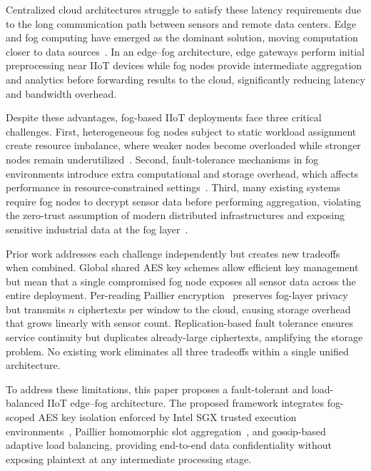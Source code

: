 \documentclass[conference]{IEEEtran}
\begin{document}
    Centralized cloud architectures struggle to satisfy these latency 
    requirements due to the long communication path between sensors and 
    remote data centers. Edge and fog computing have emerged as the 
    dominant solution, moving computation closer to data 
    sources~\cite{jin2024}. In an edge--fog architecture, edge gateways 
    perform initial preprocessing near IIoT devices while fog nodes 
    provide intermediate aggregation and analytics before forwarding 
    results to the cloud, significantly reducing latency and bandwidth 
    overhead.

    Despite these advantages, fog-based IIoT deployments face three 
    critical challenges. First, heterogeneous fog nodes subject to static 
    workload assignment create resource imbalance, where weaker nodes 
    become overloaded while stronger nodes remain 
    underutilized~\cite{kashani2023}. Second, fault-tolerance mechanisms in fog environments introduce extra computational and storage overhead, which affects performance in resource-constrained settings~\cite{chen2024lb}. Third, many 
    existing systems require fog nodes to decrypt sensor data before 
    performing aggregation, violating the zero-trust assumption of modern 
    distributed infrastructures and exposing sensitive industrial data at 
    the fog layer~\cite{mirani2022}.

    Prior work addresses each challenge independently but creates new 
    tradeoffs when combined. Global shared AES key schemes allow 
    efficient key management but mean that a single compromised fog node 
    exposes all sensor data across the entire deployment. Per-reading 
    Paillier encryption~\cite{peng2022} preserves fog-layer privacy but 
    transmits $n$ ciphertexts per window to the cloud, causing storage 
    overhead that grows linearly with sensor count. Replication-based 
    fault tolerance ensures service continuity but duplicates 
    already-large ciphertexts, amplifying the storage problem. No 
    existing work eliminates all three tradeoffs within a single unified 
    architecture.

    To address these limitations, this paper proposes a fault-tolerant
    and load-balanced IIoT edge--fog architecture. The proposed framework
    integrates fog-scoped AES key isolation enforced by Intel SGX trusted
    execution environments~\cite{costan2016}, Paillier homomorphic slot
    aggregation~\cite{paillier1999}, and gossip-based adaptive load
    balancing, providing end-to-end data confidentiality without exposing
    plaintext at any intermediate processing stage.
\end{document}
